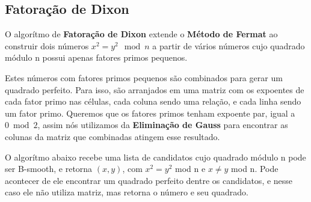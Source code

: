 \documentclass{article}
\begin{document}
\subsection{Fatoração de Dixon}
\label{dixon}
O algorítmo de \textbf{Fatoração de Dixon} extende o \textbf{Método de Fermat} ao construir dois números $x^2 = y^2 \mod n$ a partir de vários números cujo quadrado módulo n possui apenas fatores primos pequenos.

Estes números com fatores primos pequenos são combinados para gerar um quadrado perfeito. Para isso, são arranjados em uma matriz com os expoentes de cada fator primo nas células, cada coluna sendo uma relação, e cada linha sendo um fator primo. Queremos que os fatores primos tenham expoente par, igual a $0 \bmod 2$, assim nós utilizamos da \textbf{Eliminação de Gauss} para encontrar as colunas da matriz que combinadas atingem esse resultado.

O algorítmo abaixo recebe uma lista de candidatos cujo quadrado módulo n pode ser B-smooth, e retorna $(x, y)$, com $x^2 = y^2$ mod n e $x \neq y$ mod n. Pode acontecer de ele encontrar um quadrado perfeito dentre os candidatos, e nesse caso ele não utiliza matriz, mas retorna o número e seu quadrado.
\end{document}
